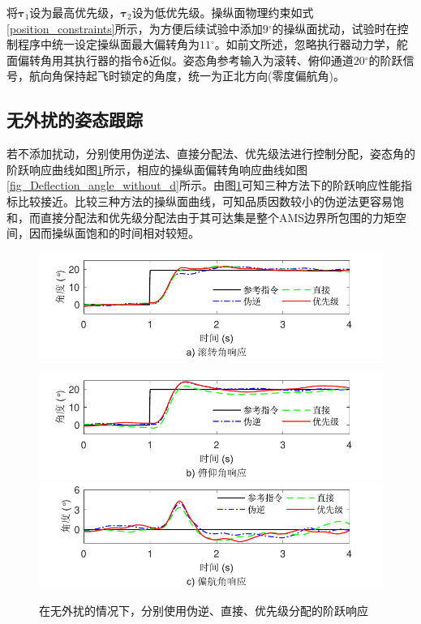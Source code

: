 将$\bm{\tau}_1$设为最高优先级，$\bm{\tau}_2$设为低优先级。操纵面物理约束如式\eqref{position_constraints}所示，为方便后续试验中添加$9{}^\circ $的操纵面扰动，试验时在控制程序中统一设定操纵面最大偏转角为$11{}^\circ $。如前文所述，忽略执行器动力学，舵面偏转角用其执行器的指令$\bm{\delta} $近似。姿态角参考输入为滚转、俯仰通道$20{}^\circ $的阶跃信号，航向角保持起飞时锁定的角度，统一为正北方向(零度偏航角)。
\subsection{无外扰的姿态跟踪}
若不添加扰动，分别使用伪逆法、直接分配法、优先级法进行控制分配，姿态角的阶跃响应曲线如图\ref{fig_step_without_d}所示，相应的操纵面偏转角响应曲线如图\ref{fig_Deflection_angle_without_d}所示。由图\ref{fig_step_without_d}可知三种方法下的阶跃响应性能指标比较接近。比较三种方法的操纵面曲线，可知品质因数较小的伪逆法更容易饱和，而直接分配法和优先级分配法由于其可达集是整个AMS边界所包围的力矩空间，因而操纵面饱和的时间相对较短。
\begin{figure}[htbp]
	\centering	
	\includegraphics[scale=1]{Fig/Fig10a.pdf}
\end{figure}
\begin{figure}[htbp]
	\centering	
			\includegraphics[scale=1]{Fig/Fig10b.pdf}
	\includegraphics[scale=1]{Fig/Fig10c.pdf}
	\caption{\label{fig_step_without_d}在无外扰的情况下，分别使用伪逆、直接、优先级分配的阶跃响应}
\end{figure}	
